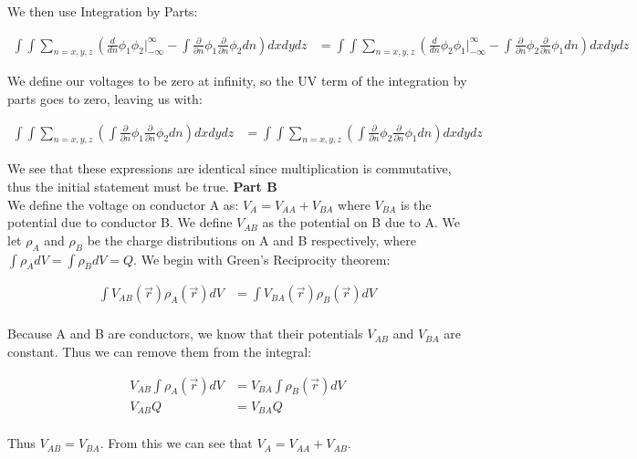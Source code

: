 \documentclass[10pt]{article} %
\begin{document}
We then use Integration by Parts:

\begin{align*}
  \int\int\sum_{n=x,y,z}\left(\frac{d}{dn}\phi_1\phi_2\Big|_{-\infty}^{\infty} - \int\frac{\partial}{\partial n}\phi_1\frac{\partial}{\partial n}\phi_2dn \right) dxdydz &=
  \int\int\sum_{n=x,y,z}\left(\frac{d}{dn}\phi_2\phi_1\Big|_{-\infty}^{\infty} - \int\frac{\partial}{\partial n}\phi_2\frac{\partial}{\partial n}\phi_1dn \right) dxdydz
\end{align*}

We define our voltages to be zero at infinity, so the UV term of the integration by parts goes to zero, leaving us with:

\begin{align*}
  \int\int\sum_{n=x,y,z}\left(\int\frac{\partial}{\partial n}\phi_1\frac{\partial}{\partial n}\phi_2dn \right) dxdydz &=
  \int\int\sum_{n=x,y,z}\left(\int\frac{\partial}{\partial n}\phi_2\frac{\partial}{\partial n}\phi_1dn \right) dxdydz
\end{align*}

We see that these expressions are identical since multiplication is commutative, thus the initial statement must be true.
\textbf{Part B}\\

We define the voltage on conductor A as: $V_A = V_{AA} + V_{BA}$ where $V_{BA}$ is the potential due to conductor B. We define $V_{AB}$ as the potential on B due to A. We let $\rho_A$ and $\rho_B$ be the charge distributions on A and B respectively, where $\int\rho_AdV = \int\rho_BdV = Q$. We begin with Green's Reciprocity theorem:

\begin{align*}
  \int V_{AB}(\vec{r})\rho_A(\vec{r})dV &= \int V_{BA}(\vec{r})\rho_B(\vec{r})dV\\
\end{align*}

Because A and B are conductors, we know that their potentials $V_{AB}$ and $V_{BA}$ are constant. Thus we can remove them from the integral:

\begin{align*}
  V_{AB}\int\rho_A(\vec{r})dV &= V_{BA}\int\rho_B(\vec{r})dV\\
  V_{AB}Q &= V_{BA}Q\\
\end{align*}

Thus $V_{AB} = V_{BA}$. From this we can see that $V_A = V_{AA} + V_{AB}$.\\
\end{document}
